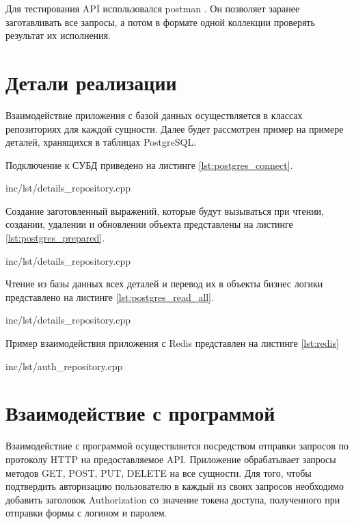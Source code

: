 Для тестирования API использовался postman \cite{postman}. Он позволяет заранее заготавливать все запросы, а потом в формате одной коллекции проверять результат их исполнения.

\section{Детали реализации}

Взаимодействие приложения с базой данных осуществляется в классах репозиториях для каждой сущности. Далее будет рассмотрен пример на примере деталей, хранящихся в таблицах PostgreSQL. 

Подключение к СУБД приведено на листинге \ref{lst:postgres_connect}.

\begin{lstinputlisting}[label=lst:postgres_connect,caption=Подключение к СУБД, language=c, firstline=25, lastline=45]{inc/lst/details_repository.cpp}
\end{lstinputlisting}

Создание заготовленный выражений, которые будут вызываться при чтении, создании, удалении и обновлении объекта представлены на листинге \ref{lst:postgres_prepared}.

\begin{lstinputlisting}[label=lst:postgres_prepared,caption=Заготовленные выражение, language=c, firstline=46, lastline=56]{inc/lst/details_repository.cpp}
\end{lstinputlisting}

Чтение из базы данных всех деталей и перевод их в объекты бизнес логики представлено на листинге \ref{lst:postgres_read_all}.

\begin{lstinputlisting}[label=lst:postgres_read_all,caption=Чтение деталей, language=c, firstline=90, lastline=108]{inc/lst/details_repository.cpp}
\end{lstinputlisting}

Пример взаимодействия приложения с Redis представлен на листинге \ref{lst:redis}

\begin{lstinputlisting}[label=lst:redis,caption=Взаимодействие приложения с Redis, language=c, firstline=15, lastline=32]{inc/lst/auth_repository.cpp}
\end{lstinputlisting}


\section{Взаимодействие с программой}
Взаимодействие с программой осуществляется посредством отправки запросов по протоколу HTTP на предоставляемое API. Приложение обрабатывает запросы методов GET, POST, PUT, DELETE на все сущности. Для того, чтобы подтвердить авторизацию пользователю в каждый из своих запросов необходимо добавить заголовок Authorization со значение токена доступа, полученного при отправки формы с логином и паролем.

